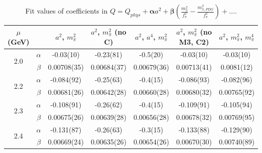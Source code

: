 \documentclass[12pt]{extarticle}
\begin{document}
\begin{table}[h!]
\begin{center}
\begin{tabular}{|c c|c|c|c|c|c|}
\hline
$\mu$ (GeV) &  & $a^2$, $m_\pi^2$& $a^2$, $m_\pi^2$ (no C)& $a^2$, $a^4$, $m_\pi^2$& $a^2$, $m_\pi^2$ (no M3, C2)& $a^2$, $m_\pi^2$, $m_\pi^4$\\
\hline
\multirow{2}{0.5in}{2.0} & $\alpha$ & -0.03(10)& -0.23(81)& -0.5(20)& -0.03(10)& -0.03(10)\\
 & $\beta$ & 0.00708(35)& 0.00684(37)& 0.00679(36)& 0.00713(41)& 0.0081(12)\\
\hline
\multirow{2}{0.5in}{2.2} & $\alpha$ & -0.084(92)& -0.25(63)& -0.4(15)& -0.086(93)& -0.082(96)\\
 & $\beta$ & 0.00681(26)& 0.00642(28)& 0.00660(28)& 0.00680(32)& 0.00765(92)\\
\hline
\multirow{2}{0.5in}{2.3} & $\alpha$ & -0.108(91)& -0.26(62)& -0.4(15)& -0.109(91)& -0.105(94)\\
 & $\beta$ & 0.00675(26)& 0.00639(28)& 0.00656(28)& 0.00678(32)& 0.00769(95)\\
\hline
\multirow{2}{0.5in}{2.4} & $\alpha$ & -0.131(87)& -0.26(63)& -0.3(15)& -0.133(88)& -0.129(90)\\
 & $\beta$ & 0.00669(24)& 0.00635(26)& 0.00654(26)& 0.00670(30)& 0.00740(89)\\
\hline
\end{tabular}
\caption{Fit values of coefficients in $Q = Q_{phys} + \mathbf{\alpha} a^2 + \mathbf{\beta}\left(\frac{m_\pi^2}{f_\pi^2}-\frac{m_{\pi,PDG}^2}{f_\pi^2}\right) + \ldots$.}
\end{center}
\end{table}




















\clearpage
\end{document}
